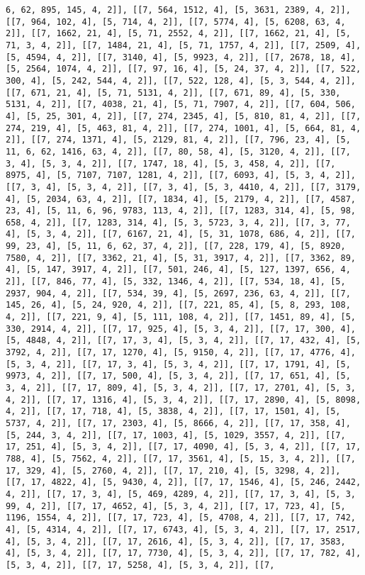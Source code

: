 \documentclass[12pt,fleqn]{article}\usepackage{../../common}
\begin{document}
\begin{verbatim}
6, 62, 895, 145, 4, 2]], [[7, 564, 1512, 4], [5, 3631, 2389, 4, 2]], [[7, 964, 102, 4], [5, 714, 4, 2]], [[7, 5774, 4], [5, 6208, 63, 4, 2]], [[7, 1662, 21, 4], [5, 71, 2552, 4, 2]], [[7, 1662, 21, 4], [5, 71, 3, 4, 2]], [[7, 1484, 21, 4], [5, 71, 1757, 4, 2]], [[7, 2509, 4], [5, 4594, 4, 2]], [[7, 3140, 4], [5, 9923, 4, 2]], [[7, 2678, 18, 4], [5, 2564, 1074, 4, 2]], [[7, 97, 16, 4], [5, 24, 37, 4, 2]], [[7, 522, 300, 4], [5, 242, 544, 4, 2]], [[7, 522, 128, 4], [5, 3, 544, 4, 2]], [[7, 671, 21, 4], [5, 71, 5131, 4, 2]], [[7, 671, 89, 4], [5, 330, 5131, 4, 2]], [[7, 4038, 21, 4], [5, 71, 7907, 4, 2]], [[7, 604, 506, 4], [5, 25, 301, 4, 2]], [[7, 274, 2345, 4], [5, 810, 81, 4, 2]], [[7, 274, 219, 4], [5, 463, 81, 4, 2]], [[7, 274, 1001, 4], [5, 664, 81, 4, 2]], [[7, 274, 1371, 4], [5, 2129, 81, 4, 2]], [[7, 796, 23, 4], [5, 11, 6, 62, 1416, 63, 4, 2]], [[7, 80, 58, 4], [5, 3120, 4, 2]], [[7, 3, 4], [5, 3, 4, 2]], [[7, 1747, 18, 4], [5, 3, 458, 4, 2]], [[7, 8975, 4], [5, 7107, 7107, 1281, 4, 2]], [[7, 6093, 4], [5, 3, 4, 2]], [[7, 3, 4], [5, 3, 4, 2]], [[7, 3, 4], [5, 3, 4410, 4, 2]], [[7, 3179, 4], [5, 2034, 63, 4, 2]], [[7, 1834, 4], [5, 2179, 4, 2]], [[7, 4587, 23, 4], [5, 11, 6, 96, 9783, 113, 4, 2]], [[7, 1283, 314, 4], [5, 98, 658, 4, 2]], [[7, 1283, 314, 4], [5, 3, 5723, 3, 4, 2]], [[7, 3, 77, 4], [5, 3, 4, 2]], [[7, 6167, 21, 4], [5, 31, 1078, 686, 4, 2]], [[7, 99, 23, 4], [5, 11, 6, 62, 37, 4, 2]], [[7, 228, 179, 4], [5, 8920, 7580, 4, 2]], [[7, 3362, 21, 4], [5, 31, 3917, 4, 2]], [[7, 3362, 89, 4], [5, 147, 3917, 4, 2]], [[7, 501, 246, 4], [5, 127, 1397, 656, 4, 2]], [[7, 846, 77, 4], [5, 332, 1346, 4, 2]], [[7, 534, 18, 4], [5, 2937, 904, 4, 2]], [[7, 534, 39, 4], [5, 2697, 236, 63, 4, 2]], [[7, 145, 26, 4], [5, 24, 920, 4, 2]], [[7, 221, 85, 4], [5, 8, 293, 108, 4, 2]], [[7, 221, 9, 4], [5, 111, 108, 4, 2]], [[7, 1451, 89, 4], [5, 330, 2914, 4, 2]], [[7, 17, 925, 4], [5, 3, 4, 2]], [[7, 17, 300, 4], [5, 4848, 4, 2]], [[7, 17, 3, 4], [5, 3, 4, 2]], [[7, 17, 432, 4], [5, 3792, 4, 2]], [[7, 17, 1270, 4], [5, 9150, 4, 2]], [[7, 17, 4776, 4], [5, 3, 4, 2]], [[7, 17, 3, 4], [5, 3, 4, 2]], [[7, 17, 1791, 4], [5, 9973, 4, 2]], [[7, 17, 500, 4], [5, 3, 4, 2]], [[7, 17, 651, 4], [5, 3, 4, 2]], [[7, 17, 809, 4], [5, 3, 4, 2]], [[7, 17, 2701, 4], [5, 3, 4, 2]], [[7, 17, 1316, 4], [5, 3, 4, 2]], [[7, 17, 2890, 4], [5, 8098, 4, 2]], [[7, 17, 718, 4], [5, 3838, 4, 2]], [[7, 17, 1501, 4], [5, 5737, 4, 2]], [[7, 17, 2303, 4], [5, 8666, 4, 2]], [[7, 17, 358, 4], [5, 244, 3, 4, 2]], [[7, 17, 1003, 4], [5, 1029, 3557, 4, 2]], [[7, 17, 251, 4], [5, 3, 4, 2]], [[7, 17, 4090, 4], [5, 3, 4, 2]], [[7, 17, 788, 4], [5, 7562, 4, 2]], [[7, 17, 3561, 4], [5, 15, 3, 4, 2]], [[7, 17, 329, 4], [5, 2760, 4, 2]], [[7, 17, 210, 4], [5, 3298, 4, 2]], [[7, 17, 4822, 4], [5, 9430, 4, 2]], [[7, 17, 1546, 4], [5, 246, 2442, 4, 2]], [[7, 17, 3, 4], [5, 469, 4289, 4, 2]], [[7, 17, 3, 4], [5, 3, 99, 4, 2]], [[7, 17, 4652, 4], [5, 3, 4, 2]], [[7, 17, 723, 4], [5, 1196, 1554, 4, 2]], [[7, 17, 723, 4], [5, 4708, 4, 2]], [[7, 17, 742, 4], [5, 4314, 4, 2]], [[7, 17, 6743, 4], [5, 3, 4, 2]], [[7, 17, 2517, 4], [5, 3, 4, 2]], [[7, 17, 2616, 4], [5, 3, 4, 2]], [[7, 17, 3583, 4], [5, 3, 4, 2]], [[7, 17, 7730, 4], [5, 3, 4, 2]], [[7, 17, 782, 4], [5, 3, 4, 2]], [[7, 17, 5258, 4], [5, 3, 4, 2]], [[7, 
\end{verbatim}
\end{document}

